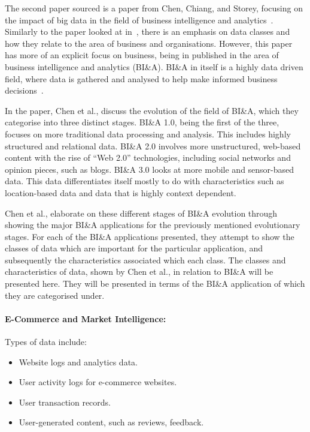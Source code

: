 \documentclass[a4paper,11pt]{article}
\begin{document}
The second paper sourced is a paper from Chen, Chiang, and Storey, focusing on the impact of big data in the field of
business intelligence and analytics~\cite{chen2012business}. Similarly to the paper looked at in~,
there is an emphasis on data classes and how they relate to the area of business and organisations. However, this paper
has more of an explicit focus on business, being in published in the area of business intelligence and analytics (BI\&A).
BI\&A in itself is a highly data driven field, where data is gathered and analysed to help make informed business
decisions~\cite{watson2009tutorial}.

In the paper, Chen et al., discuss the evolution of the field of BI\&A, which they categorise into three distinct stages.
BI\&A 1.0, being the first of the three, focuses on more traditional data processing and analysis. This includes
highly structured and relational data. BI\&A 2.0 involves more unstructured, web-based content with the rise of ``Web 2.0''
technologies, including social networks and opinion pieces, such as blogs. BI\&A 3.0 looks at more mobile and sensor-based
data. This data differentiates itself mostly to do with characteristics such as location-based data and data that is
highly context dependent.

Chen et al., elaborate on these different stages of BI\&A evolution through showing the major BI\&A applications for the
previously mentioned evolutionary stages. For each of the BI\&A applications presented, they attempt to show the classes
of data which are important for the particular application, and subsequently the characteristics associated which each
class. The classes and characteristics of data, shown by Chen et al., in relation to BI\&A will be presented here. They
will be presented in terms of the BI\&A application of which they are categorised under.

\paragraph{E-Commerce and Market Intelligence:\\}

Types of data include:

\begin{itemize}
  \item Website logs and analytics data.
  \item User activity logs for e-commerce websites.
  \item User transaction records.
  \item User-generated content, such as reviews, feedback.
\end{itemize}
\end{document}
